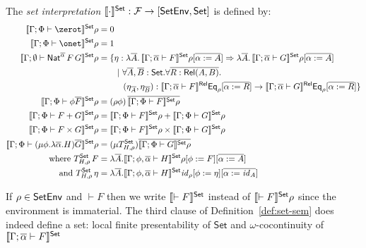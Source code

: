 \documentclass{lmcs}
\theoremstyle{plain}\newtheorem{satz}[thm]{Satz}
\newcommand{\F}{\mathcal{F}}
\newcommand{\set}{\mathsf{Set}}
\renewcommand{\id}{\mathit{id}}
\begin{document}
{\begin{defi}\label{def:set-sem}
The {\em set interpretation} $\setsem{\cdot} : \F \to [\setenv, \set]$
is defined by:
\begin{align*}
  \setsem{\Gamma;\Phi \vdash \zerot}\rho &= 0\\
  \setsem{\Gamma;\Phi \vdash \onet}\rho &= 1\\
  \setsem{\Gamma; \emptyset
    \vdash \Nat^{\ol{\alpha}}
    \,F\,G}\rho &= \{\eta : \lambda \ol{A}. \,\setsem{\Gamma;
    \ol{\alpha} \vdash
    F}\rho[\ol{\alpha := A}] 
      \Rightarrow \lambda \ol{A}.\,\setsem{\Gamma; 
        \ol{\alpha} \vdash G}\rho[\ol{\alpha := A}] \\ 
      &\hspace{0.3in}|~\forall \overline{A}, \overline{B} :
      \set. \forall \overline{R : \rel(A, B)}.\\ 
      &\hspace{0.4in}(\eta_{\overline{A}}, \eta_{\overline{B}})
      : \relsem{\Gamma; \ol{\alpha} \vdash F}\Eq_{\rho}[\ol{\alpha := R}]
      \rightarrow \relsem{\Gamma; \ol{\alpha} \vdash
        G}\Eq_{\rho}[\ol{\alpha := R}] \} \\
  \setsem{\Gamma;\Phi \vdash \phi\ol{F}}\rho &=
  (\rho\phi)\,\ol{\setsem{\Gamma;\Phi \vdash
    F}\rho}\\
  \setsem{\Gamma;\Phi \vdash F+G}\rho &=
  \setsem{\Gamma;\Phi \vdash F}\rho +
  \setsem{\Gamma;\Phi \vdash G}\rho\\
  \setsem{\Gamma;\Phi \vdash F\times G}\rho &=
  \setsem{\Gamma;\Phi \vdash F}\rho \times
  \setsem{\Gamma;\Phi \vdash G}\rho\\ 
  \setsem{\Gamma;\Phi \vdash (\mu \phi.\lambda
    \ol{\alpha}. H)\ol{G}}\rho &= (\mu
    T^\set_{H,\rho})\ol{\setsem{\Gamma;\Phi \vdash G}\rho}\\
    \text{where } T^\set_{H,\rho}\,F & = \lambda
  \ol{A}. \setsem{\Gamma;\phi, \ol{\alpha} \vdash
    H}\rho[\phi :=  F][\ol{\alpha := A}]\\
  \text{and } T^\set_{H,\rho}\,\eta &= \lambda
  \ol{A}. \setsem{\Gamma;\phi, \ol{\alpha} \vdash
    H}\id_\rho[\phi := \eta][\ol{\alpha := \id_{A}}]
\end{align*}
\end{defi}
If $\rho \in \mathsf{SetEnv}$ and $\vdash F$ then we write $\setsem{\vdash F}$
instead of $\setsem{\vdash F}\rho$ since the environment is
immaterial. The third clause of Definition~\ref{def:set-sem} does
indeed define a set: local finite presentability of $\set$ and
$\omega$-cocontinuity of $\setsem{\Gamma;\ol{\alpha} \vdash F}$
}
\end{document}
